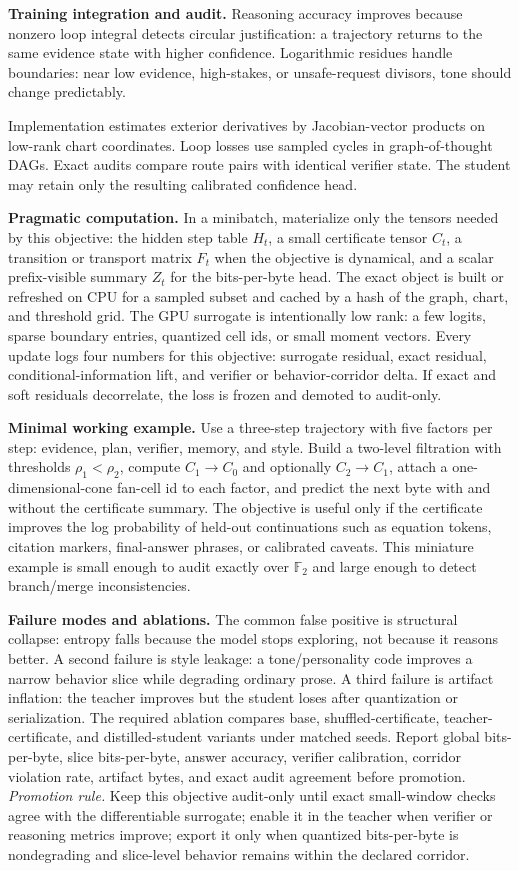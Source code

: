 \documentclass[10pt]{article}
\newcommand{\FF}{\mathbb{F}}
\numberwithin{equation}{section}
\begin{document}
\noindent\textbf{Training integration and audit.} Reasoning accuracy improves because nonzero loop integral detects circular justification: a trajectory returns to the same evidence state with higher confidence. Logarithmic residues handle boundaries: near low evidence, high-stakes, or unsafe-request divisors, tone should change predictably.

Implementation estimates exterior derivatives by Jacobian-vector products on low-rank chart coordinates. Loop losses use sampled cycles in graph-of-thought DAGs. Exact audits compare route pairs with identical verifier state. The student may retain only the resulting calibrated confidence head.

\noindent\textbf{Pragmatic computation.} In a minibatch, materialize only the tensors needed by this objective: the hidden step table $H_t$, a small certificate tensor $C_t$, a transition or transport matrix $F_t$ when the objective is dynamical, and a scalar prefix-visible summary $Z_t$ for the bits-per-byte head. The exact object is built or refreshed on CPU for a sampled subset and cached by a hash of the graph, chart, and threshold grid. The GPU surrogate is intentionally low rank: a few logits, sparse boundary entries, quantized cell ids, or small moment vectors. Every update logs four numbers for this objective: surrogate residual, exact residual, conditional-information lift, and verifier or behavior-corridor delta. If exact and soft residuals decorrelate, the loss is frozen and demoted to audit-only.

\noindent\textbf{Minimal working example.} Use a three-step trajectory with five factors per step: evidence, plan, verifier, memory, and style. Build a two-level filtration with thresholds $\rho_1<\rho_2$, compute $C_1\to C_0$ and optionally $C_2\to C_1$, attach a one-dimensional-cone fan-cell id to each factor, and predict the next byte with and without the certificate summary. The objective is useful only if the certificate improves the log probability of held-out continuations such as equation tokens, citation markers, final-answer phrases, or calibrated caveats. This miniature example is small enough to audit exactly over $\FF_2$ and large enough to detect branch/merge inconsistencies.

\noindent\textbf{Failure modes and ablations.} The common false positive is structural collapse: entropy falls because the model stops exploring, not because it reasons better. A second failure is style leakage: a tone/personality code improves a narrow behavior slice while degrading ordinary prose. A third failure is artifact inflation: the teacher improves but the student loses after quantization or serialization. The required ablation compares base, shuffled-certificate, teacher-certificate, and distilled-student variants under matched seeds. Report global bits-per-byte, slice bits-per-byte, answer accuracy, verifier calibration, corridor violation rate, artifact bytes, and exact audit agreement before promotion.
\vfill
\noindent\emph{Promotion rule.} Keep this objective audit-only until exact small-window checks agree with the differentiable surrogate; enable it in the teacher when verifier or reasoning metrics improve; export it only when quantized bits-per-byte is nondegrading and slice-level behavior remains within the declared corridor.
\clearpage
\end{document}
